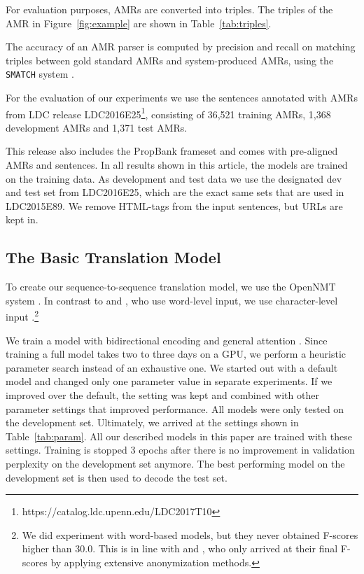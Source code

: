 \documentclass[a4paper,10pt,twoside]{article}
\begin{document}
For evaluation purposes, AMRs are converted into triples. The triples of the AMR in Figure~\ref{fig:example} are shown in Table~\ref{tab:triples}. 
 
The accuracy of an AMR parser is computed by precision and recall on matching triples between gold standard AMRs and system-produced AMRs, using the \texttt{SMATCH} system \cite{smatch:2013}.

For the evaluation of our experiments we use the sentences annotated with AMRs from LDC release LDC2016E25\footnote{https://catalog.ldc.upenn.edu/LDC2017T10}, consisting of 36,521 training AMRs, 1,368 development AMRs and 1,371 test AMRs.

This release also includes the PropBank frameset and comes with pre-aligned AMRs and sentences.
In all results shown in this article, the models are trained on the training data. As development and test data we use the designated dev and test set from LDC2016E25, which are the exact same sets that are used in LDC2015E89. We remove HTML-tags from the input sentences, but URLs are kept in. 

\subsection{The Basic Translation Model}

To create our sequence-to-sequence translation model, we use the OpenNMT system \cite{2017opennmt}.  In contrast to  and , who use word-level input, we use character-level input .\footnote{We did experiment with word-based models, but they never obtained F-scores higher than 30.0. This is in line with  and , who only arrived at their final F-scores by applying extensive anonymization methods.}

We train a model with bidirectional encoding and general attention \cite{luong15}.
Since training a full model takes two to three days on a GPU, we perform a heuristic parameter search instead of an exhaustive one. We started out with a default model and changed only one parameter value in separate experiments. If we improved over the default, the setting was kept and combined with other parameter settings that improved performance. All models were only tested on the development set. Ultimately, we arrived at the settings shown in Table~\ref{tab:param}. All our described models in this paper are trained with these settings. Training is stopped 3 epochs after there is no improvement in validation perplexity on the development set anymore. The best performing model on the development set is then used to decode the test set.
\end{document}
